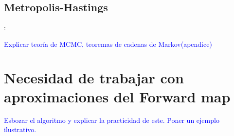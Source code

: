 \subsection{Metropolis-Hastings}:

\textcolor{blue}{Explicar teoría de MCMC, teoremas de cadenas de Markov(apendice)}


\section{Necesidad de trabajar con aproximaciones del Forward map}

\vspace{1 cm} 

\textcolor{blue}{Esbozar el algoritmo y explicar la practicidad de este. Poner un ejemplo ilustrativo.}

